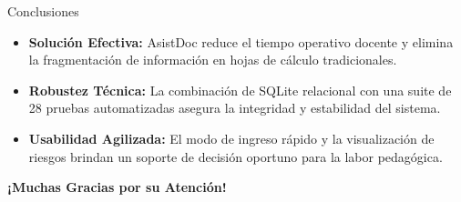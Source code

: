 \documentclass[aspectratio=169,10pt]{beamer}
\begin{document}
\begin{frame}{Conclusiones}
  \begin{itemize}
    \item \textbf{Solución Efectiva:} AsistDoc reduce el tiempo operativo docente y elimina la fragmentación de información en hojas de cálculo tradicionales.
    \item \textbf{Robustez Técnica:} La combinación de SQLite relacional con una suite de 28 pruebas automatizadas asegura la integridad y estabilidad del sistema.
    \item \textbf{Usabilidad Agilizada:} El modo de ingreso rápido y la visualización de riesgos brindan un soporte de decisión oportuno para la labor pedagógica.
  \end{itemize}
  \vspace{0.4cm}
  \begin{center}
    \large \textbf{¡Muchas Gracias por su Atención!}
  \end{center}
\end{frame}
\end{document}
